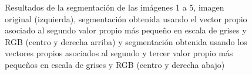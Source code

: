 \documentclass[conference]{IEEEtran}
\begin{document}
\begin{figure}[htbp]
\caption{Resultados de la segmentación de las imágenes 1 a 5, imagen original (izquierda), segmentación obtenida usando el vector propio asociado al segundo valor propio más pequeño en escala de grises y RGB (centro y derecha arriba) y segmentación obtenida usando los vectores propios asociados al segundo y tercer valor propio más pequeños en escala de grises y RGB (centro y derecha abajo)}
\label{res1}
\end{figure}
\FloatBarrier
\end{document}
